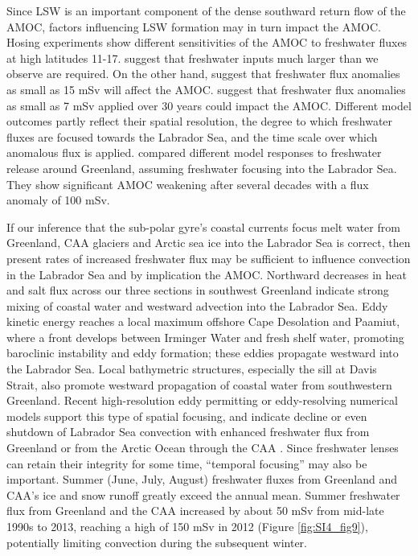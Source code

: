 Since LSW is an important component of the dense southward return flow of the AMOC, factors influencing LSW formation may in turn impact the AMOC.  Hosing experiments show different sensitivities of the AMOC to freshwater fluxes at high latitudes \cite[]{fichefet2003,jungclaus2006,stouffer2006,hu2011,swingedow2013,ridley2005,brunnabend2015}11-17.  \citet{hu2011} suggest that freshwater inputs much larger than we observe are required.  On the other hand, \citet{fichefet2003} suggest that freshwater flux anomalies as small as 15 mSv will affect the AMOC.   \citet{brunnabend2015} suggest that freshwater flux anomalies as small as 7 mSv applied over 30 years could impact the AMOC.  Different model outcomes partly reflect their spatial resolution, the degree to which freshwater fluxes are focused towards the Labrador Sea, and the time scale over which anomalous flux is applied.  \citet{swingedow2013} compared different model responses to freshwater release around Greenland, assuming freshwater focusing into the Labrador Sea.  They show significant AMOC weakening after several decades with a flux anomaly of 100 mSv.

If our inference that the sub-polar gyre’s coastal currents focus melt water from Greenland, CAA glaciers and Arctic sea ice into the Labrador Sea is correct, then present rates of increased freshwater flux may be sufficient to influence convection in the Labrador Sea and by implication the AMOC. Northward decreases in heat and salt flux across our three sections in southwest Greenland indicate strong mixing of coastal water and westward advection into the Labrador Sea.  Eddy kinetic energy reaches a local maximum offshore Cape Desolation and Paamiut, where a front develops between Irminger Water and fresh shelf water, promoting baroclinic instability and eddy formation; these eddies propagate westward into the Labrador Sea.  Local bathymetric structures, especially the sill at Davis Strait, also promote westward propagation of coastal water from southwestern Greenland.  Recent high-resolution eddy permitting or eddy-resolving numerical models support this type of spatial focusing, and indicate decline or even shutdown of Labrador Sea convection with enhanced freshwater flux from Greenland \cite[]{weijer2012} or from the Arctic Ocean through the CAA \cite[]{mcgeehan2011}.   Since freshwater lenses can retain their integrity for some time, “temporal focusing” may also be important.  Summer (June, July, August) freshwater fluxes from Greenland and CAA’s ice and snow runoff greatly exceed the annual mean. Summer freshwater flux from Greenland and the CAA increased by about 50 mSv from mid-late 1990s to 2013, reaching a high of 150 mSv in 2012 (Figure \ref{fig:SI4_fig9}), potentially limiting convection during the subsequent winter. 

